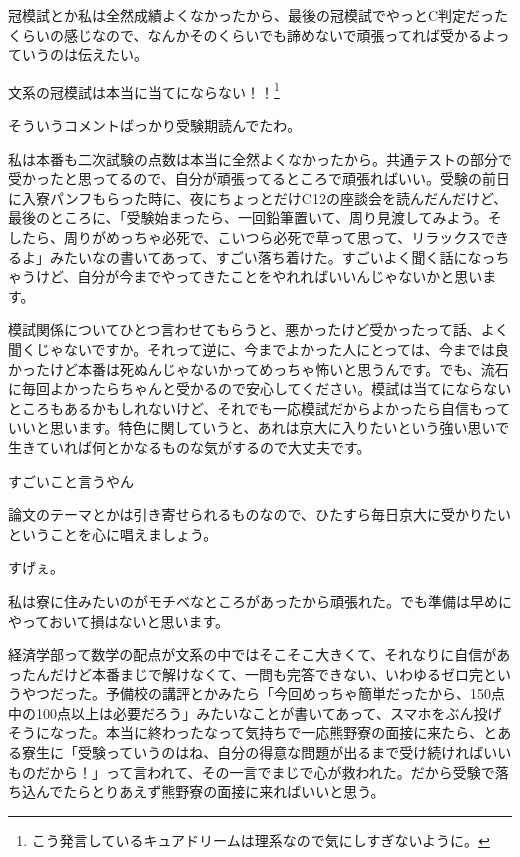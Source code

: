\begin{multicols}{2}
\vspace{15mm}

冠模試とか私は全然成績よくなかったから、最後の冠模試でやっとC判定だったくらいの感じなので、なんかそのくらいでも諦めないで頑張ってれば受かるよっていうのは伝えたい。

文系の冠模試は本当に当てにならない！！\footnote{こう発言しているキュアドリームは理系なので気にしすぎないように。}

そういうコメントばっかり受験期読んでたわ。

私は本番も二次試験の点数は本当に全然よくなかったから。共通テストの部分で受かったと思ってるので、自分が頑張ってるところで頑張ればいい。受験の前日に入寮パンフもらった時に、夜にちょっとだけC12の座談会を読んだんだけど、最後のところに、「受験始まったら、一回鉛筆置いて、周り見渡してみよう。そしたら、周りがめっちゃ必死で、こいつら必死で草って思って、リラックスできるよ」みたいなの書いてあって、すごい落ち着けた。すごいよく聞く話になっちゃうけど、自分が今までやってきたことをやれればいいんじゃないかと思います。

模試関係についてひとつ言わせてもらうと、悪かったけど受かったって話、よく聞くじゃないですか。それって逆に、今までよかった人にとっては、今までは良かったけど本番は死ぬんじゃないかってめっちゃ怖いと思うんです。でも、流石に毎回よかったらちゃんと受かるので安心してください。模試は当てにならないところもあるかもしれないけど、それでも一応模試だからよかったら自信もっていいと思います。特色に関していうと、あれは京大に入りたいという強い思いで生きていれば何とかなるものな気がするので大丈夫です。

すごいこと言うやん

論文のテーマとかは引き寄せられるものなので、ひたすら毎日京大に受かりたいということを心に唱えましょう。

すげぇ。

私は寮に住みたいのがモチベなところがあったから頑張れた。でも準備は早めにやっておいて損はないと思います。

経済学部って数学の配点が文系の中ではそこそこ大きくて、それなりに自信があったんだけど本番まじで解けなくて、一問も完答できない、いわゆるゼロ完というやつだった。予備校の講評とかみたら「今回めっちゃ簡単だったから、150点中の100点以上は必要だろう」みたいなことが書いてあって、スマホをぶん投げそうになった。本当に終わったなって気持ちで一応熊野寮の面接に来たら、とある寮生に「受験っていうのはね、自分の得意な問題が出るまで受け続ければいいものだから！」って言われて、その一言でまじで心が救われた。だから受験で落ち込んでたらとりあえず熊野寮の面接に来ればいいと思う。


\end{multicols}
